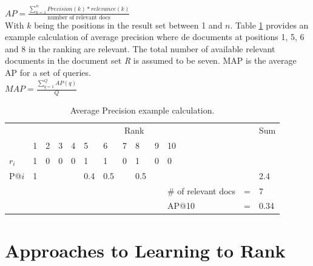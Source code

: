 $AP = \frac{\sum\nolimits_{k=1}^{n}Precision(k)*relevance(k)}{\text{number of relevant docs}}$\\

With $k$ being the positions in the result set between 1 and $n$. Table \ref{tab:example_calculation_AP} provides an example calculation of average precision where de documents at positions 1, 5, 6 and 8 in the ranking are relevant. The total number of available relevant documents in the document set \emph{R} is assumed to be seven.
\ac{MAP} is the average \ac{AP} for a set of queries.\\

$MAP = \frac{\sum\nolimits_{q=1}^{Q}AP(q)}{Q}$\\

\begin{table}
\begin{tabular}{lllllllllllll}
 & \multicolumn{10}{c}{Rank} &  & Sum \\ 
\cline{2-11}
 & 1 & 2 & 3 & 4 & 5 & 6 & 7 & 8 & 9 & 10 &  &  \\ 
\hline
$r_i$ & 1 & 0 & 0 & 0 & 1 & 1 & 0 & 1 & 0 & 0 &  &  \\ 
P@$i$ & 1 &  &  &  & 0.4 & 0.5 &  & 0.5 &  &  &  & 2.4 \\ 
\hline
 &  &  &  &  &  &  &  &  &  & \# of relevant docs & = & 7 \\ 
 &  &  &  &  &  &  &  &  &  & AP@10 & = & 0.34 \\ 
\end{tabular}
\caption{Average Precision example calculation.}
\label{tab:example_calculation_AP}
\end{table}


\section{Approaches to Learning to Rank}
\label{sec:ltr_approaches}
